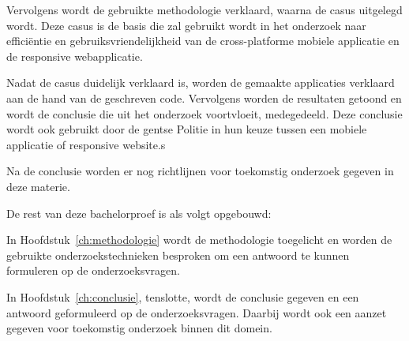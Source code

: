 Vervolgens wordt de gebruikte methodologie verklaard, waarna de casus uitgelegd wordt.
Deze casus is de basis die zal gebruikt wordt in het onderzoek naar efficiëntie en gebruiksvriendelijkheid van de
cross-platforme mobiele applicatie en de responsive webapplicatie.

Nadat de casus duidelijk verklaard is, worden de gemaakte applicaties verklaard aan de hand van de geschreven code.
Vervolgens worden de resultaten getoond en wordt de conclusie die uit het onderzoek voortvloeit, medegedeeld.
Deze conclusie wordt ook gebruikt door de gentse Politie in hun keuze tussen een mobiele applicatie of responsive website.s

Na de conclusie worden er nog richtlijnen voor toekomstig onderzoek gegeven in deze materie.


De rest van deze bachelorproef is als volgt opgebouwd:

In Hoofdstuk~\ref{ch:methodologie} wordt de methodologie toegelicht en worden de gebruikte onderzoekstechnieken besproken om een antwoord te kunnen formuleren op de onderzoeksvragen.


In Hoofdstuk~\ref{ch:conclusie}, tenslotte, wordt de conclusie gegeven en een antwoord geformuleerd op de onderzoeksvragen. Daarbij wordt ook een aanzet gegeven voor toekomstig onderzoek binnen dit domein.
